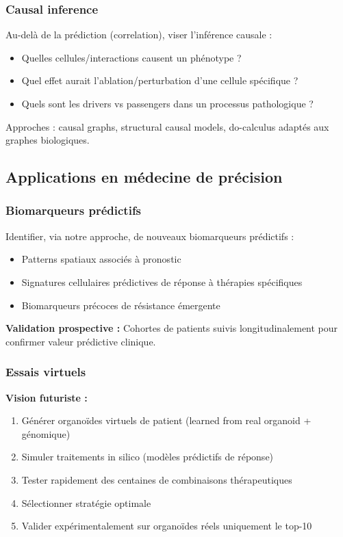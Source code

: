 \subsubsection{Causal inference}

Au-delà de la prédiction (correlation), viser l'inférence causale :
\begin{itemize}
    \item Quelles cellules/interactions causent un phénotype ?
    \item Quel effet aurait l'ablation/perturbation d'une cellule spécifique ?
    \item Quels sont les drivers vs passengers dans un processus pathologique ?
\end{itemize}

Approches : causal graphs, structural causal models, do-calculus adaptés aux graphes biologiques.

\subsection{Applications en médecine de précision}

\subsubsection{Biomarqueurs prédictifs}

Identifier, via notre approche, de nouveaux biomarqueurs prédictifs :
\begin{itemize}
    \item Patterns spatiaux associés à pronostic
    \item Signatures cellulaires prédictives de réponse à thérapies spécifiques
    \item Biomarqueurs précoces de résistance émergente
\end{itemize}

\textbf{Validation prospective :}
Cohortes de patients suivis longitudinalement pour confirmer valeur prédictive clinique.

\subsubsection{Essais virtuels}

\textbf{Vision futuriste :}
\begin{enumerate}
    \item Générer organoïdes virtuels de patient (learned from real organoid + génomique)
    \item Simuler traitements in silico (modèles prédictifs de réponse)
    \item Tester rapidement des centaines de combinaisons thérapeutiques
    \item Sélectionner stratégie optimale
    \item Valider expérimentalement sur organoïdes réels uniquement le top-10
\end{enumerate}

